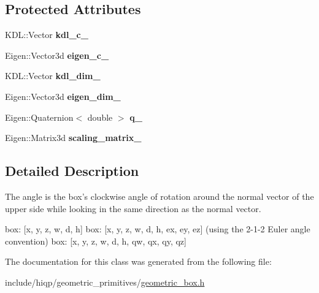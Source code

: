 \subsection*{Protected Attributes}
\begin{DoxyCompactItemize}
\item 
\hypertarget{classhiqp_1_1GeometricBox_a02279ab5253006aac02740629db34932}{K\-D\-L\-::\-Vector {\bfseries kdl\-\_\-c\-\_\-}}\label{classhiqp_1_1GeometricBox_a02279ab5253006aac02740629db34932}

\item 
\hypertarget{classhiqp_1_1GeometricBox_a92a6aea04ef44baea9ebbed8307f0079}{Eigen\-::\-Vector3d {\bfseries eigen\-\_\-c\-\_\-}}\label{classhiqp_1_1GeometricBox_a92a6aea04ef44baea9ebbed8307f0079}

\item 
\hypertarget{classhiqp_1_1GeometricBox_ad8a47990544aa36dafcc11040048a108}{K\-D\-L\-::\-Vector {\bfseries kdl\-\_\-dim\-\_\-}}\label{classhiqp_1_1GeometricBox_ad8a47990544aa36dafcc11040048a108}

\item 
\hypertarget{classhiqp_1_1GeometricBox_a0e7eba7dbf3848a7d4feaace36d95c11}{Eigen\-::\-Vector3d {\bfseries eigen\-\_\-dim\-\_\-}}\label{classhiqp_1_1GeometricBox_a0e7eba7dbf3848a7d4feaace36d95c11}

\item 
\hypertarget{classhiqp_1_1GeometricBox_aa271ce5b588e7e18253376953c65c1f4}{Eigen\-::\-Quaternion$<$ double $>$ {\bfseries q\-\_\-}}\label{classhiqp_1_1GeometricBox_aa271ce5b588e7e18253376953c65c1f4}

\item 
\hypertarget{classhiqp_1_1GeometricBox_a158a7530a006282b6d37ae1d1e200b72}{Eigen\-::\-Matrix3d {\bfseries scaling\-\_\-matrix\-\_\-}}\label{classhiqp_1_1GeometricBox_a158a7530a006282b6d37ae1d1e200b72}

\end{DoxyCompactItemize}


\subsection{Detailed Description}
The angle is the box's clockwise angle of rotation around the normal vector of the upper side while looking in the same direction as the normal vector. 

box\-: \mbox{[}x, y, z, w, d, h\mbox{]} box\-: \mbox{[}x, y, z, w, d, h, ex, ey, ez\mbox{]} (using the 2-\/1-\/2 Euler angle convention) box\-: \mbox{[}x, y, z, w, d, h, qw, qx, qy, qz\mbox{]} 

The documentation for this class was generated from the following file\-:\begin{DoxyCompactItemize}
\item 
include/hiqp/geometric\-\_\-primitives/\hyperlink{geometric__box_8h}{geometric\-\_\-box.\-h}\end{DoxyCompactItemize}
